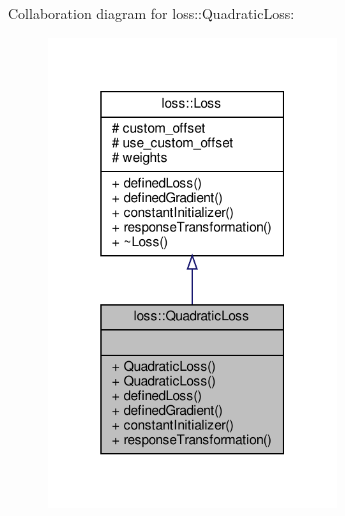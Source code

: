 Collaboration diagram for loss\+:\+:Quadratic\+Loss\+:
\nopagebreak
\begin{figure}[H]
\begin{center}
\leavevmode
\includegraphics[width=217pt]{classloss_1_1_quadratic_loss__coll__graph}
\end{center}
\end{figure}
